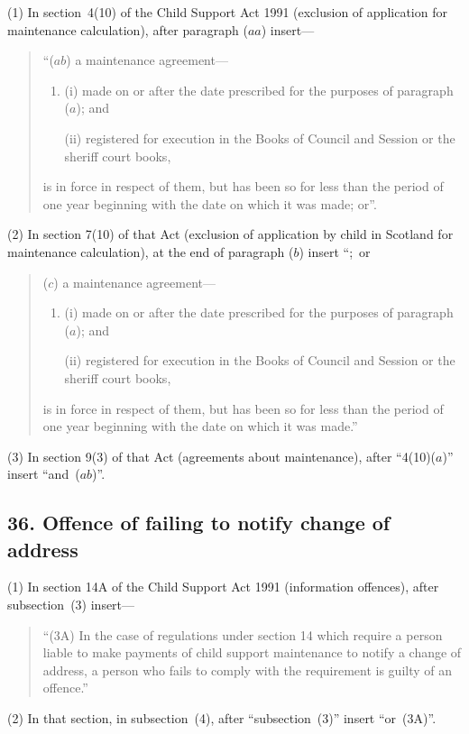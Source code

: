 \documentclass[12pt,a4paper]{article}
\begin{document}
(1) In section~4(10) of the Child Support Act 1991 (exclusion of application for maintenance calculation), after paragraph ($aa$) insert---
\begin{quotation}
“($ab$) a maintenance agreement—
\begin{enumerate}\item[]
(i) made on or after the date prescribed for the purposes of paragraph ($a$); and

(ii) registered for execution in the Books of Council and Session or the sheriff court books,
\end{enumerate}
is in force in respect of them, but has been so for less than the period of one year beginning with the date on which it was made; or”.
\end{quotation}

(2) In section 7(10) of that Act (exclusion of application by child in Scotland for maintenance calculation), at the end of paragraph ($b$) insert “;~or 
\begin{quotation}
($c$) a maintenance agreement—
\begin{enumerate}\item[]
(i) made on or after the date prescribed for the purposes of paragraph ($a$); and

(ii) registered for execution in the Books of Council and Session or the sheriff court books,
\end{enumerate}
is in force in respect of them, but has been so for less than the period of one year beginning with the date on which it was made.”
\end{quotation}

(3) In section 9(3) of that Act (agreements about maintenance), after “4(10)($a$)” insert “and~($ab$)”.

\subsection{36. Offence of failing to notify change of address}

(1) In section 14A of the Child Support Act 1991 (information offences), after subsection~(3) insert—
\begin{quotation}
“(3A) In the case of regulations under section 14 which require a person liable to make payments of child support maintenance to notify a change of address, a person who fails to comply with the requirement is guilty of an offence.”
\end{quotation}

(2) In that section, in subsection~(4), after “subsection~(3)” insert “or~(3A)”.
\end{document}

